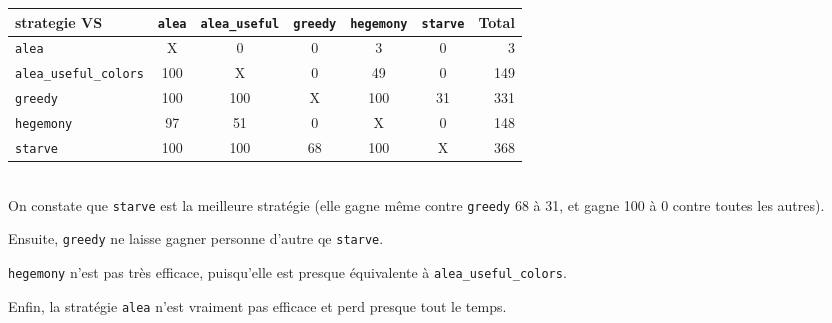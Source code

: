 \documentclass[12pt]{article}
\begin{document}
\begin{tabular}{l|c|c|c|c|c|r}
strategie VS & \texttt{alea} & \texttt{alea\_useful} & \texttt{greedy} & \texttt{hegemony} & \texttt{starve} & Total\\
\hline
\texttt{alea} & X & 0 & 0 & 3 & 0 & 3\\
\hline
\texttt{alea\_useful\_colors} & 100 & X & 0 & 49 & 0 & 149\\
\hline
\texttt{greedy} & 100 & 100 & X & 100 & 31 & 331\\
\hline
\texttt{hegemony} & 97 & 51 & 0 & X & 0 & 148\\
\hline
\texttt{starve} & 100 & 100 & 68 & 100 & X & 368\\
\hline
\end{tabular}\\

On constate que \texttt{starve} est la meilleure stratégie (elle gagne même contre \texttt{greedy} 68 à 31, et gagne 100 à 0 contre toutes les autres).

Ensuite, \texttt{greedy} ne laisse gagner personne d'autre qe \texttt{starve}.

\texttt{hegemony} n'est pas très efficace, puisqu'elle est presque équivalente à \texttt{alea\_useful\_colors}.

Enfin, la stratégie \texttt{alea} n'est vraiment pas efficace et perd presque tout le temps. 

\end{document}
